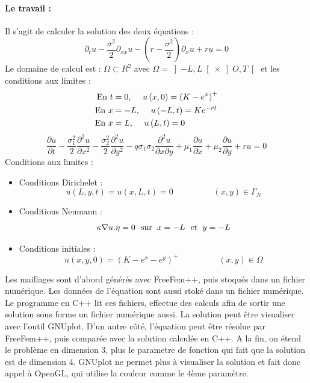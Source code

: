 \documentclass{book}
\begin{document}
\paragraph{Le travail : } Il s'agit de calculer la solution des deux équations :
\begin{equation}
\label{equation1}
\partial_{t}u-\frac{\sigma^{2}}{2}\partial_{xx}u-\left(r-\frac{\sigma^{2}}{2}\right)\partial_{x}u+ru=0 
\end{equation}
Le domaine de calcul est : $\Omega \subset R^{2}$ avec $\Omega=\left]-L,L\right[\times\left]O,T\right[$ 
et les conditions aux limites :
\[
\begin{split}
 \hbox{En }t &=0\hbox{,\hspace{0.5cm}} u\left(x,0\right)=\left(K-e^{x}\right)^{+} \\
 \hbox{En }x &=-L\hbox{,\hspace{0.5cm}} u\left(-L,t\right)=Ke^{-rt} \\
 \hbox{En }x &=L\hbox{,\hspace{0.5cm}} u\left(L,t\right)=0
\end{split}
\]
\begin{equation}
\label{equation2}
\frac{\partial u}{\partial t}-\frac{\sigma_{1}^{2}}{2}\frac{\partial^{2}u}{\partial x^{2}}-\frac{\sigma_{2}^{2}}{2}\frac{\partial^{2}u}{\partial y^{2}}-q\sigma_{1}\sigma_{2}\frac{\partial^{2}u}{\partial x\partial y}+\mu_{1}\frac{\partial u}{\partial x}+\mu_{2}\frac{\partial u}{\partial y}+ru=0
\end{equation}
Conditions aux limites :
\begin{itemize}
 \item Conditions Dirichelet : 
	\[u(L,y,t)=u(x,L,t)=0 \hspace{2cm} (x,y)\in \Gamma_{N}\]
 \item Conditions Neumann    : 
	\[\kappa \nabla u.\eta =0 ~~\hbox{sur}\hspace{0.2cm}x=-L~~\hbox{et}\hspace{0.2cm}  y=-L \]
 \item Conditions initiales :
   	\[u(x,y,0)=(K-e^{x}-e^{y})^{+}  \hspace{2cm} (x,y)\in \Omega\] 
\end{itemize}
Les maillages sont d'abord générés avec FreeFem++, puis stoqués dans un fichier numérique. Les données de l'équation sont aussi stoké dans un fichier numérique. Le programme en C++ lit ces fichiers, effectue des calculs afin de sortir une solution sous forme un fichier numérique aussi. La solution peut être visualiser avec l'outil GNUplot. D'un autre côté, l'équation peut être résolue par FreeFem++, puis comparée avec la solution calculée en C++. A la fin, on étend le problème en dimension 3, plus le parametre de fonction qui fait que la solution est de dimension 4. GNUplot ne permet plus à visualiser la solution et fait donc appel à OpenGL, qui utilise la couleur comme le 4ème paramètre. 
\end{document}
